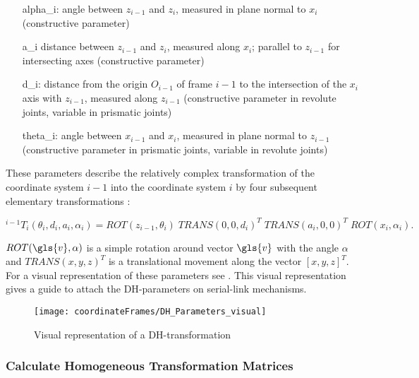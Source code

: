 \begin{enumerate}[label=\emph{\arabic*)}]
	\item[\gls{alpha_i}:] angle between $z_{i-1}$ and $z_i$, measured in plane normal to $x_i$ (constructive parameter)
	\item[\gls{a_i}] distance between $z_{i-1}$ and $z_i$, measured along $x_i$; parallel to $z_{i-1}$ %
	for intersecting axes (constructive parameter)
	\item[\gls{d_i}:] distance from the origin $O_{i-1}$ of frame $i-1$ to the intersection of the $x_i$ axis with $z_{i-1}$, measured along $z_{i-1}$ (constructive parameter in revolute joints, variable in prismatic joints)
	\item[\gls{theta_i}:] angle between $x_{i-1}$ and $x_i$, measured in plane normal to $z_{i-1}$ (constructive parameter in prismatic joints, variable in revolute joints)
\end{enumerate}

These parameters describe the relatively complex transformation of the coordinate system $i-1$ into the coordinate system $i$ by four subsequent elementary transformations \cite{allgInvKin}:

\begin{equation} \label{eq:DH-Transform}
^{i-1}T_i(\theta_i,d_i,a_i,\alpha_i)=ROT(z_{i-1}, \theta_i) \phantom{.} TRANS(0,0,d_i)^T \phantom{.} TRANS(a_i,0,0)^T \phantom{.} ROT(x_i,\alpha_i).
\end{equation}

$ROT(\gls{v},\alpha)$ is a simple rotation around vector $\gls{v}$ with the angle $\alpha$ and $TRANS(x,y,z)^T$ is a translational movement along the vector $[x,y,z]^T$. For a visual representation of these parameters see . This visual representation gives a guide to attach the \ac{DH}-parameters on serial-link mechanisms.

\begin{figure}[H]
	\texttt{[image: coordinateFrames/DH\_Parameters\_visual]}
	\caption{Visual representation of a \ac{DH}-transformation}
	\label{fig:DH_Parameters_visual}
\end{figure}




\subsubsection{Calculate Homogeneous Transformation Matrices}

